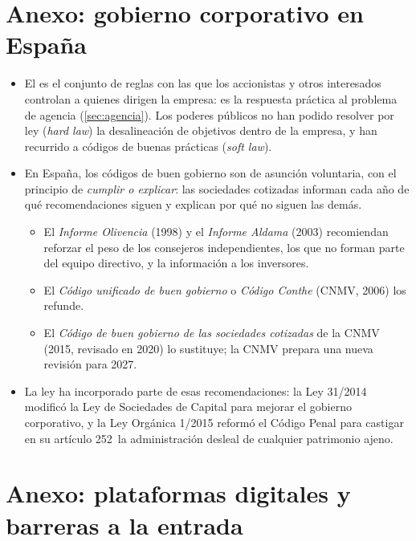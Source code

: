 \documentclass[11pt]{article}
\begin{document}
\section{Anexo: gobierno corporativo en España}\label{anexo:gobierno-corporativo}

\begin{itemize}
\item El  es el conjunto de reglas con las que los accionistas y otros interesados controlan a quienes dirigen la empresa: es la respuesta práctica al problema de agencia (\ref{sec:agencia}). Los poderes públicos no han podido resolver por ley (\emph{hard law}) la desalineación de objetivos dentro de la empresa, y han recurrido a códigos de buenas prácticas (\emph{soft law}).
\item En España, los códigos de buen gobierno son de asunción voluntaria, con el principio de \emph{cumplir o explicar}: las sociedades cotizadas informan cada año de qué recomendaciones siguen y explican por qué no siguen las demás.
  \begin{itemize}
  \item El \emph{Informe Olivencia} (1998) y el \emph{Informe Aldama} (2003) recomiendan reforzar el peso de los consejeros independientes, los que no forman parte del equipo directivo, y la información a los inversores\nocite{CNMV1998Olivencia,CNMV2003Aldama}.
  \item El \emph{Código unificado de buen gobierno} o \emph{Código Conthe} (CNMV, 2006) los refunde\nocite{CNMV2006Unificado}.
  \item El \emph{Código de buen gobierno de las sociedades cotizadas} de la CNMV (2015, revisado en 2020) lo sustituye\nocite{CNMV2015CBG,CNMV2020CBG}; la CNMV prepara una nueva revisión para 2027\nocite{CNMV2025RevisionCBG}.
  \end{itemize}
\item La ley ha incorporado parte de esas recomendaciones: la Ley 31/2014 modificó la Ley de Sociedades de Capital para mejorar el gobierno corporativo\nocite{Ley2014GobiernoCorporativo}, y la Ley Orgánica 1/2015 reformó el Código Penal para castigar en su artículo 252~la administración desleal de cualquier patrimonio ajeno\nocite{BOE2015LO1}.
\end{itemize}

\section{Anexo: plataformas digitales y barreras a la entrada}\label{anexo:plataformas}
\end{document}
